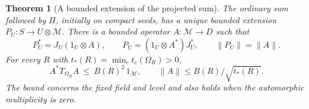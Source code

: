 \documentclass[a4paper,11pt]{article}
\newtheorem{theorem}[proposition]{Theorem}
\theoremstyle{definition}
\theoremstyle{remark}
\numberwithin{equation}{section}
\begin{document}
\begin{theorem}[A bounded extension of the projected sum]
\label{thm:adjoint157}
The ordinary sum followed by \(\Pi\), initially on compact
seeds, has a unique bounded extension \(P_U:S\to U\otimes
\mathcal M\). There is a bounded operator \(A:\mathcal M\to D\)
such that
\begin{equation}
      P_U^*=J_U(1_U\otimes A),\qquad
      P_U=(1_U\otimes A^*)J_U^*,\qquad \|P_U\|=\|A\|.
      \label{eq:adj157}
\end{equation}
For every \(R\) with \(t_*(R)=\min_c t_c(\Omega_R)>0\),
\begin{equation}
       A^* T_{\Omega_R} A\ \le\ B(R)^2\,1_{\mathcal M},
       \qquad \|A\|\le B(R)/\sqrt{t_*(R)} .
       \label{eq:bound157}
\end{equation}
The bound concerns the fixed field and level and also holds
when the automorphic multiplicity is zero.
\end{theorem}
\end{document}
